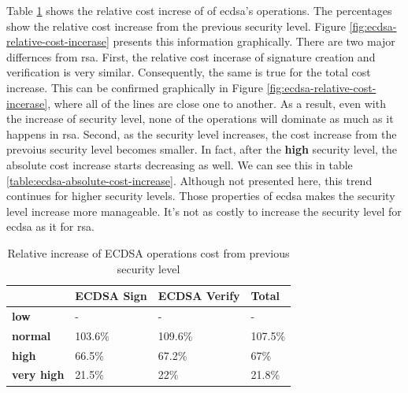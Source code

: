 \documentclass{llncs}
\begin{document}
Table \ref{table:ecdsa-relative-cost-increase} shows the relative cost increse of of \gls{ecdsa}'s operations. The percentages 
show the relative cost increase from the previous security level. Figure \ref{fig:ecdsa-relative-cost-incerase} presents this information
graphically. There are two major differnces from \gls{rsa}. First, the relative cost incerase 
of signature creation and verification is very similar. Consequently, the same is true for the total cost increase. This can be confirmed
graphically in Figure \ref{fig:ecdsa-relative-cost-incerase}, where all of the lines are 
close one to another. As a result, even with the increase of security level, none of the operations will dominate as much as it happens
in \gls{rsa}. Second, as the security level increases, the cost increase from the prevoius security level becomes smaller. In fact, after the
\textbf{high} security level, the absolute cost increase starts decreasing as well. We can see this in table \ref{table:ecdsa-absolute-cost-increase}.
Although not presented here, this trend continues for higher security levels. 
Those properties of \gls{ecdsa} makes the security level increase more manageable. It's not as costly to increase the security level for \gls{ecdsa} as it for \gls{rsa}.

\begin{table}[]
  \begin{tabular}{|l|l|l|l|}
    \hline
  & \textbf{ECDSA Sign} & \textbf{ECDSA Verify} & \textbf{Total} \\ \hline
  \textbf{low}       & -                 & -                   & -              \\ \hline
  \textbf{normal}    & 103.6\%           & 109.6\%             & 107.5\%        \\ \hline
  \textbf{high}      & 66.5\%            & 67.2\%              & 67\%           \\ \hline
  \textbf{very high} & 21.5\%            & 22\%                & 21.8\%         \\ \hline
  \end{tabular}
  \caption{\label{table:ecdsa-relative-cost-increase} Relative increase of ECDSA operations cost from previous security level}
  \end{table}
\end{document}
